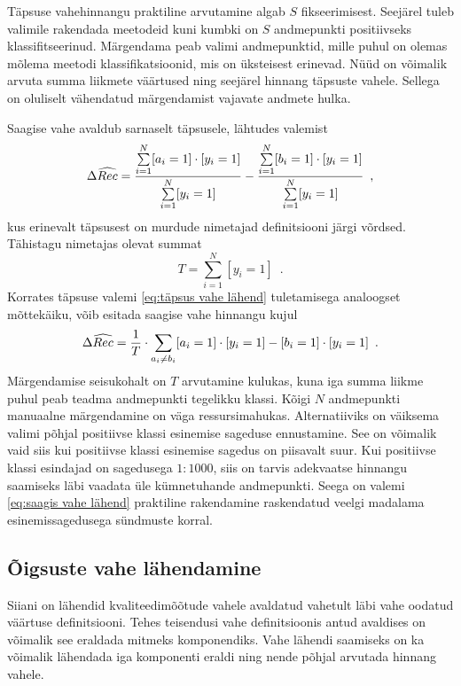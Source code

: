 Täpsuse vahehinnangu praktiline arvutamine algab $S$ fikseerimisest. Seejärel tuleb valimile rakendada meetodeid kuni kumbki on $S$ andmepunkti positiivseks klassifitseerinud. Märgendama peab valimi andmepunktid, mille puhul on olemas mõlema meetodi klassifikatsioonid, mis on üksteisest erinevad. Nüüd on võimalik arvuta summa liikmete väärtused ning seejärel hinnang täpsuste vahele. Sellega on oluliselt vähendatud märgendamist vajavate andmete hulka.

Saagise vahe avaldub sarnaselt täpsusele, lähtudes valemist
\begin{equation*}
    \Delta\widehat{Rec}=\frac{\sum\limits_{i=1}^{N}[a_i=1]\cdot[y_i=1]}{\sum\limits_{i=1}^{N}[y_i=1]}-\frac{\sum\limits_{i=1}^{N}[b_i=1]\cdot[y_i=1]}{\sum\limits_{i=1}^{N}[y_i=1]} \enspace,
\end{equation*}
kus erinevalt täpsusest on murdude nimetajad definitsiooni järgi võrdsed. Tähistagu nimetajas olevat summat
\begin{equation*}
    T=\sum_{i=1}^N[y_i=1] \enspace.
\end{equation*}
Korrates täpsuse valemi \eqref{eq:täpsus vahe lähend} tuletamisega analoogset mõttekäiku, võib esitada saagise vahe hinnangu kujul
\begin{equation}
    \label{eq:saagis vahe lähend}
     \Delta\widehat{Rec}=\frac{1}{T}\cdot\sum_{a_i\neq b_i}[a_i=1]\cdot[y_i=1]-[b_i=1]\cdot[y_i=1] \enspace. 
\end{equation}
Märgendamise seisukohalt on $T$ arvutamine kulukas, kuna iga summa liikme puhul peab teadma andmepunkti tegelikku klassi. Kõigi $N$ andmepunkti manuaalne märgendamine on väga ressursimahukas. 
Alternatiiviks on väiksema valimi põhjal positiivse klassi esinemise sageduse ennustamine. See on võimalik vaid siis kui positiivse klassi esinemise sagedus on piisavalt suur. Kui positiivse klassi esindajad on sagedusega $1:1000$, siis on tarvis adekvaatse hinnangu saamiseks läbi vaadata üle kümnetuhande andmepunkti. Seega on valemi \eqref{eq:saagis vahe lähend} praktiline rakendamine raskendatud veelgi madalama esinemissagedusega sündmuste korral.

\subsection{Õigsuste vahe lähendamine}
Siiani on lähendid kvaliteedimõõtude vahele avaldatud vahetult läbi vahe oodatud väärtuse definitsiooni. Tehes teisendusi vahe definitsioonis antud avaldises on võimalik see eraldada mitmeks komponendiks. Vahe lähendi saamiseks on ka võimalik lähendada iga komponenti eraldi ning nende põhjal arvutada hinnang vahele.


